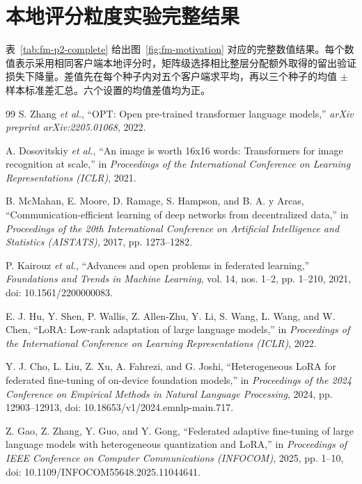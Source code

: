 \documentclass[10pt,conference,letterpaper]{IEEEtran}
\begin{document}
\section{本地评分粒度实验完整结果}
\label{app:fm-p2-details}
表~\ref{tab:fm-p2-complete} 给出图~\ref{fig:fm-motivation} 对应的完整数值结果。每个数值表示采用相同客户端本地评分时，矩阵级选择相比整层分配额外取得的留出验证损失下降量。差值先在每个种子内对五个客户端求平均，再以三个种子的均值 $\pm$ 样本标准差汇总。六个设置的均值差值均为正。


\FloatBarrier
\begin{thebibliography}{99}
S. Zhang \emph{et al.},
``OPT: Open pre-trained transformer language models,''
\emph{arXiv preprint arXiv:2205.01068}, 2022.

A. Dosovitskiy \emph{et al.},
``An image is worth 16x16 words: Transformers for image recognition at scale,''
in \emph{Proceedings of the International Conference on Learning Representations (ICLR)}, 2021.

B. McMahan, E. Moore, D. Ramage, S. Hampson, and B. A. y Arcas,
``Communication-efficient learning of deep networks from decentralized data,''
in \emph{Proceedings of the 20th International Conference on Artificial Intelligence and Statistics (AISTATS)}, 2017, pp. 1273--1282.

P. Kairouz \emph{et al.},
``Advances and open problems in federated learning,''
\emph{Foundations and Trends in Machine Learning}, vol. 14, nos. 1--2, pp. 1--210, 2021,
doi: 10.1561/2200000083.

E. J. Hu, Y. Shen, P. Wallis, Z. Allen-Zhu, Y. Li, S. Wang, L. Wang, and W. Chen,
``LoRA: Low-rank adaptation of large language models,''
in \emph{Proceedings of the International Conference on Learning Representations (ICLR)}, 2022.

Y. J. Cho, L. Liu, Z. Xu, A. Fahrezi, and G. Joshi,
``Heterogeneous LoRA for federated fine-tuning of on-device foundation models,''
in \emph{Proceedings of the 2024 Conference on Empirical Methods in Natural Language Processing}, 2024, pp. 12903--12913,
doi: 10.18653/v1/2024.emnlp-main.717.

Z. Gao, Z. Zhang, Y. Guo, and Y. Gong,
``Federated adaptive fine-tuning of large language models with heterogeneous quantization and LoRA,''
in \emph{Proceedings of IEEE Conference on Computer Communications (INFOCOM)}, 2025, pp. 1--10,
doi: 10.1109/INFOCOM55648.2025.11044641.


\end{thebibliography}
\end{document}
